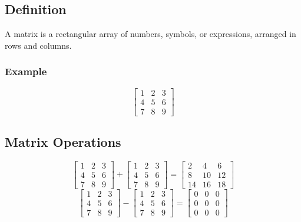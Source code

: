 \documentclass[titlepage,a4paper]{article}
\begin{document}
	\subsection{Definition}
			A matrix is a rectangular array of numbers, symbols, or expressions, arranged in rows and columns.
		\subsubsection{Example}
			\begin{equation*}
				\left[
				\begin{matrix}
					1 & 2 & 3 \\
					4 & 5 & 6 \\
					7 & 8 & 9
				\end{matrix}
				\right]
			\end{equation*}
		\subsection{Matrix Operations}
			\begin{equation*}
				\left[
				\begin{matrix}
					1 & 2 & 3 \\
					4 & 5 & 6 \\
					7 & 8 & 9
				\end{matrix}
				\right]
				+
				\left[
				\begin{matrix}
					1 & 2 & 3 \\
					4 & 5 & 6 \\
					7 & 8 & 9
				\end{matrix}
				\right]
				=
				\left[
				\begin{matrix}
					2 & 4 & 6 \\
					8 & 10 & 12 \\
					14 & 16 & 18
				\end{matrix}
				\right]
			\end{equation*}
			\begin{equation*}
				\left[
				\begin{matrix}
					1 & 2 & 3 \\
					4 & 5 & 6 \\
					7 & 8 & 9
				\end{matrix}
				\right]
				-
				\left[
				\begin{matrix}
					1 & 2 & 3 \\
					4 & 5 & 6 \\
					7 & 8 & 9
				\end{matrix}
				\right]
				=
				\left[
				\begin{matrix}
					0 & 0 & 0 \\
					0 & 0 & 0 \\
					0 & 0 & 0
				\end{matrix}
				\right]
			\end{equation*}
\end{document}
